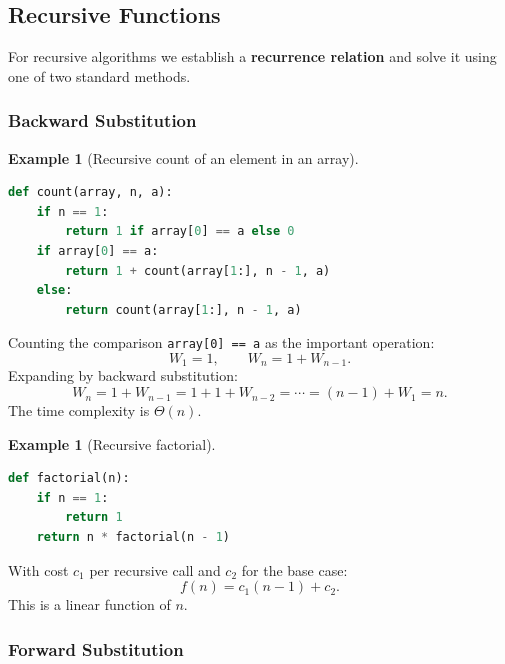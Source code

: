 \documentclass[11pt, a4paper, notitlepage]{report}
\theoremstyle{definition}
\theoremstyle{remark}
\theoremstyle{definition}
\newtheorem{example}[theorem]{Example}
\begin{document}
\subsection{Recursive Functions}
\label{subsec:recursion}

For recursive algorithms we establish a \textbf{recurrence relation} and solve
it using one of two standard methods.

\subsubsection*{Backward Substitution}

\begin{example}[Recursive count of an element in an array]
\label{ex:count-recursive}
\leavevmode
\begin{lstlisting}[language=Python]
def count(array, n, a):
    if n == 1:
        return 1 if array[0] == a else 0
    if array[0] == a:
        return 1 + count(array[1:], n - 1, a)
    else:
        return count(array[1:], n - 1, a)
\end{lstlisting}
Counting the comparison \texttt{array[0] == a} as the important operation:
\[
  W_1 = 1, \qquad W_n = 1 + W_{n-1}.
\]
Expanding by backward substitution:
\[
  W_n = 1 + W_{n-1} = 1 + 1 + W_{n-2} = \cdots = (n-1) + W_1 = n.
\]
The time complexity is $\Theta(n)$.
\end{example}

\begin{example}[Recursive factorial]
\label{ex:factorial-recursive}
\leavevmode
\begin{lstlisting}[language=Python]
def factorial(n):
    if n == 1:
        return 1
    return n * factorial(n - 1)
\end{lstlisting}
With cost $c_1$ per recursive call and $c_2$ for the base case:
\[
  f(n) = c_1(n-1) + c_2.
\]
This is a linear function of $n$.
\end{example}

\subsubsection*{Forward Substitution}
\end{document}
